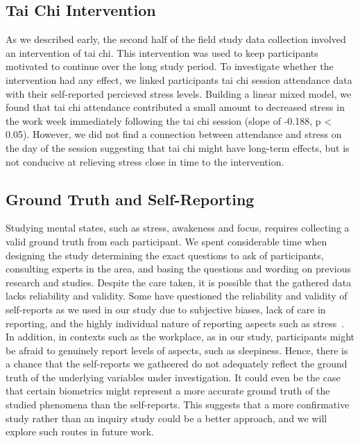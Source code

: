 
\subsection{Tai Chi Intervention}
As we described early, the second half of the field study data
collection involved an intervention of tai chi. This intervention was
used to keep participants motivated to continue over the long study
period.  To investigate whether the intervention had any effect, we
linked participants tai chi session attendance data with their
self-reported percieved stress levels. Building a linear mixed model, we found that tai chi
attendance contributed a small amount to decreased stress in the work
week immediately following the tai chi session (slope of -0.188, p <
0.05). However, we did not find a connection between attendance and
stress on the day of the session suggesting that tai chi might have
long-term effects, but is not conducive at relieving stress close
in time to the intervention.

\subsection{Ground Truth and Self-Reporting}
Studying mental states, such as stress, awakeness and focus,
requires collecting a valid ground truth from each participant.
We spent considerable time when designing the study
 determining the exact questions to ask of participants,
consulting experts in the area, and basing
the questions and wording on previous research and studies. 
Despite the care taken, it is possible that the 
gathered data lacks reliability and validity. Some have
questioned the
reliability and validity of self-reports as we used in our study
due to subjective biases, lack of care in reporting, and the
highly individual nature of reporting aspects such as
stress~\cite{Hernandez11,Hovsepian15}. In addition, in contexts such
as the workplace, as in our study,
participants  might be afraid to genuinely report levels
of aspects, such as sleepiness. Hence, there is a chance that the
self-reports we gatheered  do not adequately reflect the ground
truth of the underlying variables under investigation. It could even be
the case that certain biometrics might represent a more accurate
ground truth of the studied phenomena than the self-reports. This
suggests that a more confirmative study rather than an inquiry study
could be a better approach, and we will explore such routes in future
work.

